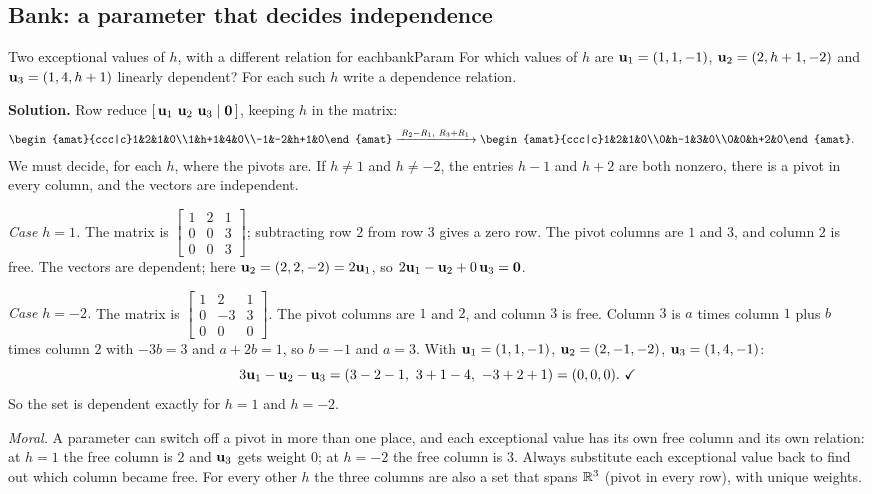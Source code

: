 \documentclass[11pt]{article}
\begin{document}
\subsection*{Bank: a parameter that decides independence}

\begin{exmp}{Two exceptional values of $h$, with a different relation for each}{bankParam}
For which values of $h$ are $\mathbf{u}_1=(1,1,-1)$, $\mathbf{u}_2=(2,h+1,-2)$ and $\mathbf{u}_3=(1,4,h+1)$ linearly dependent? For each such $h$ write a dependence relation.

\textbf{Solution.} Row reduce $[\,\bv{u}_1\ \bv{u}_2\ \bv{u}_3\mid\bv{0}\,]$, keeping $h$ in the matrix:
\begin{align*}
\begin{amat}{ccc|c}1&2&1&0\\1&h+1&4&0\\-1&-2&h+1&0\end{amat}
&\rops{R_2-R_1,\ R_3+R_1}
\begin{amat}{ccc|c}1&2&1&0\\0&h-1&3&0\\0&0&h+2&0\end{amat}.
\end{align*}
We must decide, for each $h$, where the pivots are. If $h\neq1$ and $h\neq-2$, the entries $h-1$ and $h+2$ are both nonzero, there is a pivot in every column, and the vectors are independent.

\emph{Case $h=1$.} The matrix is $\begin{bmatrix}1&2&1\\0&0&3\\0&0&3\end{bmatrix}$; subtracting row $2$ from row $3$ gives a zero row. The pivot columns are $1$ and $3$, and column $2$ is free. The vectors are dependent; here $\mathbf{u}_2=(2,2,-2)=2\mathbf{u}_1$, so $2\mathbf{u}_1-\mathbf{u}_2+0\,\mathbf{u}_3=\mathbf{0}$.

\emph{Case $h=-2$.} The matrix is $\begin{bmatrix}1&2&1\\0&-3&3\\0&0&0\end{bmatrix}$. The pivot columns are $1$ and $2$, and column $3$ is free. Column $3$ is $a$ times column $1$ plus $b$ times column $2$ with $-3b=3$ and $a+2b=1$, so $b=-1$ and $a=3$. With $\mathbf{u}_1=(1,1,-1)$, $\mathbf{u}_2=(2,-1,-2)$, $\mathbf{u}_3=(1,4,-1)$:
\[
3\bv{u}_1-\bv{u}_2-\bv{u}_3=(3-2-1,\ 3+1-4,\ -3+2+1)=(0,0,0).\ \checkmark
\]
So the set is dependent exactly for $h=1$ and $h=-2$.

\emph{Moral.} A parameter can switch off a pivot in more than one place, and each exceptional value has its own free column and its own relation: at $h=1$ the free column is $2$ and $\mathbf{u}_3$ gets weight $0$; at $h=-2$ the free column is $3$. Always substitute each exceptional value back to find out which column became free. For every other $h$ the three columns are also a set that spans $\mathbb{R}^3$ (pivot in every row), with unique weights.
\end{exmp}
\end{document}
